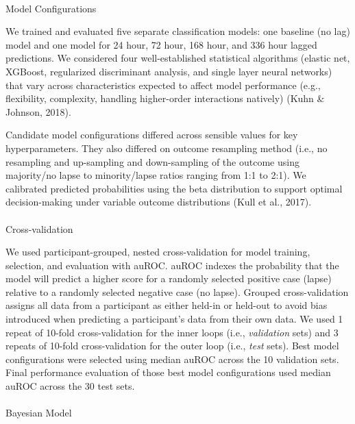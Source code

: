 \documentclass[
]{agujournal2019}
\makeatletter
\let\oldparagraph\paragraph
\renewcommand{\paragraph}{
    \@ifstar
      \xxxParagraphStar
      \xxxParagraphNoStar
  }
\newcommand{\xxxParagraphStar}[1]{\oldparagraph*{#1}\mbox{}}
\newcommand{\xxxParagraphNoStar}[1]{\oldparagraph{#1}\mbox{}}
\makeatother
\begin{document}
\paragraph{Model Configurations}\label{model-configurations}

We trained and evaluated five separate classification models: one
baseline (no lag) model and one model for 24 hour, 72 hour, 168 hour,
and 336 hour lagged predictions. We considered four well-established
statistical algorithms (elastic net, XGBoost, regularized discriminant
analysis, and single layer neural networks) that vary across
characteristics expected to affect model performance (e.g., flexibility,
complexity, handling higher-order interactions natively) (Kuhn \&
Johnson, 2018).

Candidate model configurations differed across sensible values for key
hyperparameters. They also differed on outcome resampling method (i.e.,
no resampling and up-sampling and down-sampling of the outcome using
majority/no lapse to minority/lapse ratios ranging from 1:1 to 2:1). We
calibrated predicted probabilities using the beta distribution to
support optimal decision-making under variable outcome distributions
(Kull et al., 2017).

\paragraph{Cross-validation}\label{cross-validation}

We used participant-grouped, nested cross-validation for model training,
selection, and evaluation with auROC. auROC indexes the probability that
the model will predict a higher score for a randomly selected positive
case (lapse) relative to a randomly selected negative case (no lapse).
Grouped cross-validation assigns all data from a participant as either
held-in or held-out to avoid bias introduced when predicting a
participant's data from their own data. We used 1 repeat of 10-fold
cross-validation for the inner loops (i.e., \emph{validation} sets) and
3 repeats of 10-fold cross-validation for the outer loop (i.e.,
\emph{test} sets). Best model configurations were selected using median
auROC across the 10 validation sets. Final performance evaluation of
those best model configurations used median auROC across the 30 test
sets.

\paragraph{Bayesian Model}\label{bayesian-model}
\end{document}
